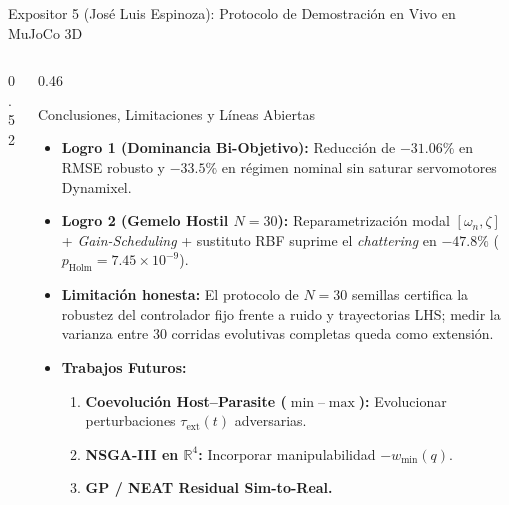 \documentclass[aspectratio=169,10pt]{beamer}
\begin{document}
\begin{frame}{Expositor 5 (José Luis Espinoza): Protocolo de Demostración en Vivo en MuJoCo 3D}
\begin{columns}[T,onlytextwidth]
\begin{column}{0.52\textwidth}
\end{column}
\begin{column}{0.46\textwidth}
    \begin{exampleblock}{Conclusiones, Limitaciones y Líneas Abiertas}
        \scriptsize
        \begin{itemize}
            \item \textbf{Logro 1 (Dominancia Bi-Objetivo):} Reducción de $-31.06\%$ en RMSE robusto y $-33.5\%$ en régimen nominal sin saturar servomotores Dynamixel.
            \item \textbf{Logro 2 (Gemelo Hostil $N=30$):} Reparametrización modal $[\omega_n,\zeta]$ + \textit{Gain-Scheduling} + sustituto RBF suprime el \textit{chattering} en $\mathbf{-47.8\%}$ ($p_{\text{Holm}}=7.45\times 10^{-9}$).
            \item \textbf{Limitación honesta:} El protocolo de $N=30$ semillas certifica la robustez del controlador fijo frente a ruido y trayectorias LHS; medir la varianza entre 30 corridas evolutivas completas queda como extensión.
            \item \textbf{Trabajos Futuros:}
            \begin{enumerate}
                \item \textbf{Coevolución Host--Parasite ($\min\text{--}\max$):} Evolucionar perturbaciones $\tau_{\text{ext}}(t)$ adversarias.
                \item \textbf{NSGA-III en $\mathbb{R}^4$:} Incorporar manipulabilidad $-w_{\min}(q)$.
                \item \textbf{GP / NEAT Residual Sim-to-Real.}
            \end{enumerate}
        \end{itemize}
    \end{exampleblock}
\end{column}
\end{columns}
\end{frame}
\end{document}
